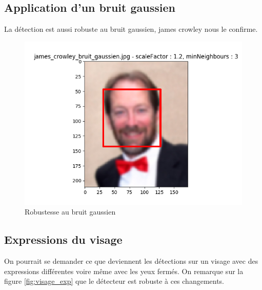 \documentclass[a4paper,11pt]{article}
\begin{document}
    \subsection{Application d'un bruit gaussien}

	La détection est aussi robuste au bruit gaussien, james crowley nous le confirme.

	    \begin{figure}[H]
	        \begin{center}
	           \includegraphics[scale = 0.6]{images/james_crowley_bruit_gaussien_1,2_3.png}
	           \caption{Robustesse au bruit gaussien}
	           \label{fig:edward}
	        \end{center}
	    \end{figure}
	    

    \subsection{Expressions du visage}
	
	On pourrait se demander ce que deviennent les détections sur un visage avec des expressions
	différentes voire même avec les yeux fermés. On remarque sur la figure \ref{fig:visage_exp}
	que le détecteur est robuste à ces changements.
\end{document}

